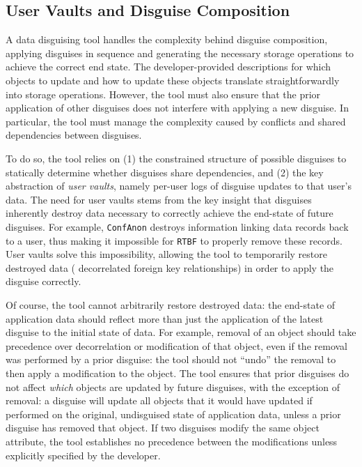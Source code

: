 \subsection{User Vaults and Disguise Composition}
\label{sec:composition}
A data disguising tool handles the complexity behind disguise composition, applying disguises in
sequence and generating the necessary storage operations to achieve the correct end state.  The
developer-provided descriptions for which objects to update and how to update these objects
translate straightforwardly into storage operations.  However, the tool must also ensure that the
prior application of other disguises does not interfere with applying a new disguise. In particular,
the tool must manage the complexity caused by conflicts and shared dependencies between disguises. 

To do so, the tool relies on (1) the constrained structure of possible disguises to statically determine
whether disguises share dependencies, and (2) the key abstraction of \emph{user vaults}, namely per-user
logs of disguise updates to that user's data. The need for user vaults stems from the key
insight that disguises inherently destroy data necessary to correctly achieve the end-state of
future disguises. For example, \texttt{ConfAnon} destroys information linking data records back to a
user, thus making it impossible for \texttt{RTBF} to properly remove these records. 
User vaults solve this impossibility, allowing the tool to temporarily restore destroyed data (\eg
decorrelated foreign key relationships) in order to apply the disguise correctly.

Of course, the tool cannot arbitrarily restore destroyed data: the end-state of application data
should reflect more than just the application of the latest disguise to the initial state of data.
For example, removal of an object should take precedence over decorrelation or modification of that
object, even if the removal was performed by a prior disguise: the tool should not ``undo'' the
removal to then apply a modification to the object. The tool ensures that prior disguises do not
affect \emph{which} objects are updated by future disguises, with the exception of removal: a
disguise will update all objects that it would have updated if performed on the original,
undisguised state of application data, unless a prior disguise has removed that object. If two
disguises modify the same object attribute, the tool establishes no precedence between the
modifications unless explicitly specified by the developer. 

